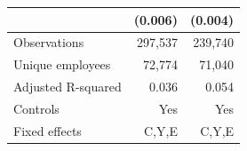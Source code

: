 {\begin{tabular}{l*{2}{D{.}{.}{-1}}}
                    &     (0.006)         &     (0.004)         \\
\midrule
Observations        &     297,537         &     239,740         \\
Unique employees    &      72,774         &      71,040         \\
Adjusted R-squared  &       0.036         &       0.054         \\
Controls            &         Yes         &         Yes         \\
Fixed effects       &       C,Y,E         &       C,Y,E         \\
\bottomrule
\end{tabular}
}
